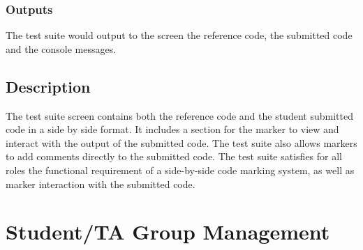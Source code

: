 \documentclass{article}
\begin{document}
\subsubsection{Outputs}
The test suite would output to the screen the reference code, the submitted code and the console messages.
\subsection{Description}
The test suite screen contains both the reference code and the student submitted code in a side by side format.  It includes a section for the marker to view and interact with the output of the submitted code.  The test suite also allows markers to add comments directly to the submitted code.  The test suite satisfies for all roles the functional requirement of a side-by-side code marking system, as well as marker interaction with the submitted code.

\section{Student/TA Group Management}
\end{document}

